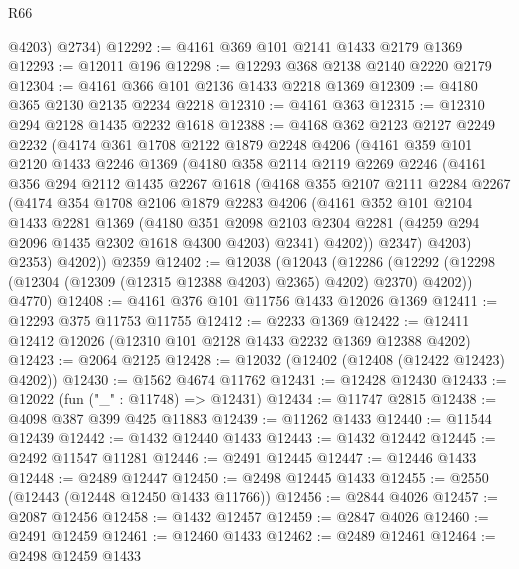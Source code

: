 \begin{lexlean}{R66}
\begin{coremodule}
        @4203)
      @2734)
@12292 := @4161 @369 @101 @2141 @1433 @2179 @1369
@12293 := @12011 @196
@12298 := @12293 @368 @2138 @2140 @2220 @2179
@12304 := @4161 @366 @101 @2136 @1433 @2218 @1369
@12309 := @4180 @365 @2130 @2135 @2234 @2218
@12310 := @4161 @363
@12315 := @12310 @294 @2128 @1435 @2232 @1618
@12388 := @4168
    @362
    @2123
    @2127
    @2249
    @2232
    (@4174
      @361
      @1708
      @2122
      @1879
      @2248
      @4206
      (@4161
        @359
        @101
        @2120
        @1433
        @2246
        @1369
        (@4180
          @358
          @2114
          @2119
          @2269
          @2246
          (@4161
            @356
            @294
            @2112
            @1435
            @2267
            @1618
            (@4168
              @355
              @2107
              @2111
              @2284
              @2267
              (@4174
                @354
                @1708
                @2106
                @1879
                @2283
                @4206
                (@4161
                  @352
                  @101
                  @2104
                  @1433
                  @2281
                  @1369
                  (@4180
                    @351
                    @2098
                    @2103
                    @2304
                    @2281
                    (@4259 @294 @2096 @1435 @2302 @1618 @4300 @4203)
                    @2341)
                  @4202))
              @2347)
            @4203)
          @2353)
        @4202))
    @2359
@12402 := @12038
    (@12043
      (@12286 (@12292 (@12298 (@12304 (@12309 (@12315 @12388 @4203) @2365) @4202) @2370) @4202))
      @4770)
@12408 := @4161 @376 @101 @11756 @1433 @12026 @1369
@12411 := @12293 @375 @11753 @11755
@12412 := @2233 @1369
@12422 := @12411 @12412 @12026 (@12310 @101 @2128 @1433 @2232 @1369 @12388 @4202)
@12423 := @2064 @2125
@12428 := @12032 (@12402 (@12408 (@12422 @12423) @4202))
@12430 := @1562 @4674 @11762
@12431 := @12428 @12430
@12433 := @12022 (fun ("_" : @11748) => @12431)
@12434 := @11747 @2815
@12438 := @4098 @387 @399 @425 @11883
@12439 := @11262 @1433
@12440 := @11544 @12439
@12442 := @1432 @12440 @1433
@12443 := @1432 @12442
@12445 := @2492 @11547 @11281
@12446 := @2491 @12445
@12447 := @12446 @1433
@12448 := @2489 @12447
@12450 := @2498 @12445 @1433
@12455 := @2550 (@12443 (@12448 @12450 @1433 @11766))
@12456 := @2844 @4026
@12457 := @2087 @12456
@12458 := @1432 @12457
@12459 := @2847 @4026
@12460 := @2491 @12459
@12461 := @12460 @1433
@12462 := @2489 @12461
@12464 := @2498 @12459 @1433

\end{coremodule}
\end{lexlean}
